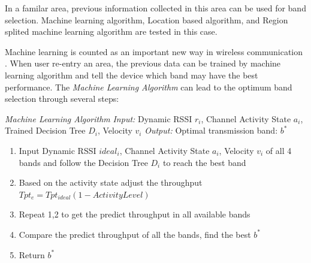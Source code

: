 In a familar area, previous information collected in this area can be used for band selection. Machine learning algorithm, Location based algorithm, and Region splited machine learning algorithm are tested in this case.

Machine learning is counted as an important new way in wireless communication \cite{haykin2005cognitive}. When user re-entry an area, the previous data can be trained by machine learning algorithm and tell the device which band may have the best performance.
The \emph{Machine Learning Algorithm} can lead to the optimum band selection through several steps:

\emph{Machine Learning Algorithm}
\emph{Input:} Dynamic RSSI $r_i$, Channel Activity State $a_i$, Trained Decision Tree $D_i$, Velocity $v_i$ 
\emph{Output:} Optimal transmission band: $b^*$

\begin{enumerate}
\item Input Dynamic RSSI $ideal_i$, Channel Activity State $a_i$, Velocity $v_i$ of all 4 bands and follow the Decision Tree $D_i$ to reach the best band 
\item Based on the activity state adjust the throughput $Tpt_e=Tpt_{ideal}(1-Activity Level)$
\item Repeat 1,2 to get the predict throughput in all available bands
\item Compare the predict throughput of all the bands, find the best $b^*$
\item Return $b^*$
\end{enumerate}




